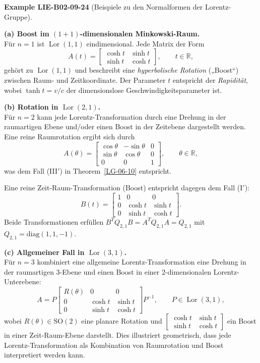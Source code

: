 \documentclass[10pt, letterpaper]{article}
\newcommand{\CustomHeading}[3]{%
  \par\medskip\noindent%
  \textbf{#1 #2} \textnormal{(#3)}.\enskip%
}
\newenvironment{EXA}[2]{\begin{unitbox}\CustomHeading{Example}{#1}{#2}}{\end{unitbox}}
\begin{document}
\begin{EXA}{LIE-B02-09-24}{Beispiele zu den Normalformen der Lorentz-Gruppe}
\noindent\textbf{(a) Boost im \((1+1)\)-dimensionalen Minkowski-Raum.}\\[2pt]
Für \(n=1\) ist \(\operatorname{Lor}(1,1)\) eindimensional.
Jede Matrix der Form
\[
A(t)=
\begin{bmatrix}
\cosh t & \sinh t\\[2pt]
\sinh t & \cosh t
\end{bmatrix},
\qquad t\in\mathbb{R},
\]
gehört zu \(\operatorname{Lor}(1,1)\) und beschreibt eine \emph{hyperbolische Rotation}
(„Boost“) zwischen Raum- und Zeitkoordinate.
Der Parameter \(t\) entspricht der \emph{Rapidität}, wobei
\(\tanh t = v/c\) der dimensionslose Geschwindigkeitsparameter ist.

\vspace{0.5em}
\noindent\textbf{(b) Rotation in \(\operatorname{Lor}(2,1)\).}\\[2pt]
Für \(n=2\) kann jede Lorentz-Transformation durch eine Drehung in der raumartigen
Ebene und/oder einen Boost in der Zeitebene dargestellt werden.
Eine reine Raumrotation ergibt sich durch
\[
A(\theta)=
\begin{bmatrix}
\cos\theta & -\sin\theta & 0\\[2pt]
\sin\theta & \cos\theta & 0\\[2pt]
0 & 0 & 1
\end{bmatrix},
\qquad \theta\in\mathbb{R},
\]
was dem Fall (III$'$) in Theorem~\ref{LG-06-10} entspricht.

Eine reine Zeit-Raum-Transformation (Boost) entspricht dagegen dem Fall (I$'$):
\[
B(t)=
\begin{bmatrix}
1 & 0 & 0\\[2pt]
0 & \cosh t & \sinh t\\[2pt]
0 & \sinh t & \cosh t
\end{bmatrix}.
\]
Beide Transformationen erfüllen
\(B^{T}Q_{2,1}B = A^{T}Q_{2,1}A = Q_{2,1}\)
mit \(Q_{2,1}=\mathrm{diag}(1,1,-1)\).

\vspace{0.5em}
\noindent\textbf{(c) Allgemeiner Fall in \(\operatorname{Lor}(3,1)\).}\\[2pt]
Für \(n=3\) kombiniert eine allgemeine Lorentz-Transformation
eine Drehung in der raumartigen \(3\)-Ebene und einen Boost
in einer \(2\)-dimensionalen Lorentz-Unterebene:
\[
A = P
\begin{bmatrix}
R(\theta) & 0 & 0\\[2pt]
0 & \cosh t & \sinh t\\[2pt]
0 & \sinh t & \cosh t
\end{bmatrix}
P^{-1},
\qquad P\in\operatorname{Lor}(3,1),
\]
wobei \(R(\theta)\in\mathrm{SO}(2)\) eine planare Rotation und
\(\begin{bmatrix}\cosh t & \sinh t\\[2pt]\sinh t & \cosh t\end{bmatrix}\)
ein Boost in einer Zeit-Raum-Ebene darstellt.
Dies illustriert geometrisch, dass jede Lorentz-Transformation als Kombination
von Raumrotation und Boost interpretiert werden kann.
\end{EXA}
\end{document}

